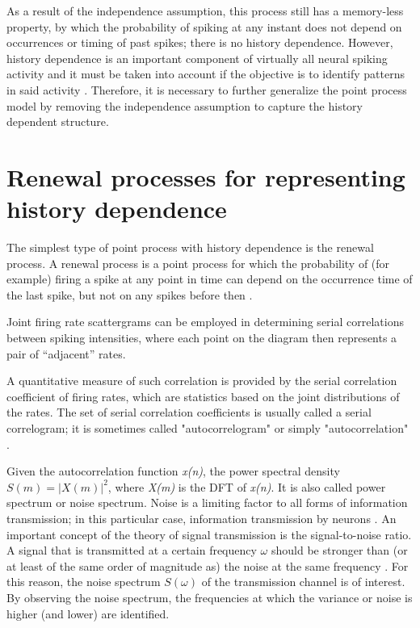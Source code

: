 \documentclass{kththesis}
\begin{document}
As a result of the independence assumption, this process still has a memory-less property, by which the probability of spiking at any instant does not depend on occurrences or timing of past spikes; there is no history dependence. 
However, history dependence is an important component of virtually all neural spiking activity and it must be taken into account if the objective is to identify patterns in said activity \parencite{Perkel}. 
Therefore, it is necessary to further generalize the point process model by removing the independence assumption to capture the history dependent structure.

\section{Renewal processes for representing history dependence}

The simplest type of point process with history dependence is the renewal process. 
A renewal process is a point process for which the probability of (for example) firing a spike at any point in time can depend on the occurrence time of the last spike, but not on any spikes before then  \parencite{Perkel}. 

Joint firing rate scattergrams can be employed in determining serial correlations between spiking intensities, where each point on the diagram then represents a pair of “adjacent” rates. 

A quantitative measure of such correlation is provided by the serial correlation coefficient of firing rates, which are statistics based on the joint distributions of the rates. 
The set of serial correlation coefficients is usually called a serial correlogram; it is sometimes called "autocorrelogram" or simply "autocorrelation"  \parencite{Perkel}. 

Given the autocorrelation function \textit{x(n)}, the power spectral density \begin{math}S(m) = |X(m)|^2\end{math}, where \textit{X(m)} is the DFT of \textit{x(n)}. 
It is also called power spectrum or noise spectrum. 
Noise is a limiting factor to all forms of information transmission; in this particular case, information transmission by neurons \parencite{Gerstner}. 
An important concept of the theory of signal transmission is the signal-to-noise ratio. 
A signal that is transmitted at a certain frequency \begin{math}\omega\end{math} should be stronger than (or at least of the same order of magnitude as) the noise at the same frequency \parencite{Gerstner}. 
For this reason, the noise spectrum \begin{math}S(\omega)\end{math} of the transmission channel is of interest. 
By observing the noise spectrum, the frequencies at which the variance or noise is higher (and lower) are identified.
\end{document}

